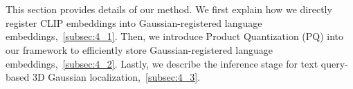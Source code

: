 \section{\nickname}
\label{sec:methodology}

This section provides details of our method. 
We first explain how we directly register CLIP embeddings into Gaussian-registered language embeddings,~\cref{subsec:4_1}. 
Then, we introduce Product Quantization (PQ) into our framework to efficiently store Gaussian-registered language embeddings,~\cref{subsec:4_2}.
Lastly, we describe the inference stage for text query-based 3D Gaussian localization,~\cref{subsec:4_3}.
